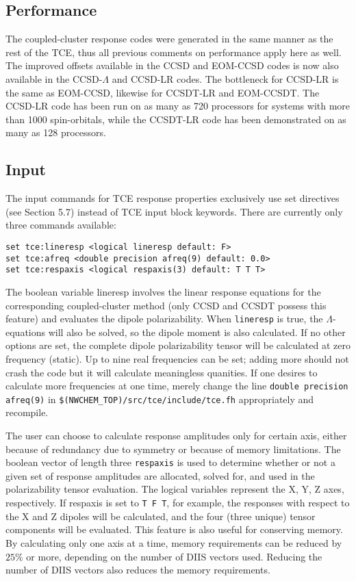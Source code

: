 \subsection{Performance}

The coupled-cluster response codes were generated in the same manner as the rest of the TCE, thus all previous comments on performance apply here as well.  The improved offsets available in the CCSD and EOM-CCSD codes is now also available in the CCSD-$\Lambda$ and CCSD-LR codes.  The bottleneck for CCSD-LR is the same as EOM-CCSD, likewise for CCSDT-LR and EOM-CCSDT.  The CCSD-LR code has been run on as many as 720 processors for systems with more than 1000 spin-orbitals, while the CCSDT-LR code has been demonstrated on as many as 128 processors.

\subsection{Input}

The input commands for TCE response properties exclusively use set directives (see Section 5.7) instead of TCE input block keywords.  There are currently only three commands available:

\begin{verbatim}
set tce:lineresp <logical lineresp default: F>
set tce:afreq <double precision afreq(9) default: 0.0>
set tce:respaxis <logical respaxis(3) default: T T T>
\end{verbatim}

The boolean variable lineresp involves the linear response equations for the corresponding coupled-cluster method (only CCSD and CCSDT possess this feature) and evaluates the dipole polarizability.  When \verb+lineresp+ is true, the $\Lambda$-equations will also be solved, so the dipole moment is also calculated.  If no other options are set, the complete dipole polarizability tensor will be calculated at zero frequency (static). Up to nine real frequencies can be set; adding more should not crash the code but it will calculate meaningless quanities.  If one desires to calculate more frequencies at one time, merely change the line \verb+double precision afreq(9)+ in \verb+$(NWCHEM_TOP)/src/tce/include/tce.fh+ appropriately and recompile.

The user can choose to calculate response amplitudes only for certain axis, either because of redundancy due to symmetry or because of memory limitations.  The boolean vector of length three \verb+respaxis+ is used to determine whether or not a given set of response amplitudes are allocated, solved for, and used in the polarizability tensor evaluation.  The logical variables represent the X, Y, Z axes, respectively.  If respaxis is set to \verb+T F T+, for example, the responses with respect to the X and Z dipoles will be calculated, and the four (three unique) tensor components will be evaluated.  This feature is also useful for conserving memory.  By calculating only one axis at a time, memory requirements can be reduced by $25\%$ or more, depending on the number of DIIS vectors used.  Reducing the number of DIIS vectors also reduces the memory requirements.

